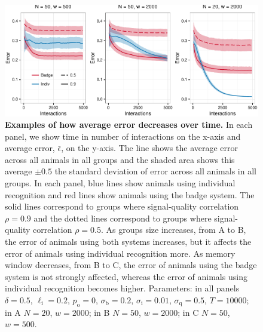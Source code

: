\begin{figure}
\label{learning_curves}
\includegraphics[width=.95\textwidth]{figures/learning_curves.pdf}
\caption{\label{learning_curves} \sffamily\small\textbf{Examples of how average error decreases over time.}
In each panel, we show time in number of interactions on the x-axis and average error, $\bar{\epsilon}$, on the y-axis. The line shows the average error across all animals in all groups and the shaded area shows this average $\pm 0.5$ the standard deviation of error across all animals in all groups. In each panel, blue lines show animals using individual recognition and red lines show animals using the badge system. The solid lines correspond to groups where signal-quality correlation $\rho=0.9$ and the dotted lines correspond to groups where signal-quality correlation $\rho=0.5$. As groups size increases, from A to B, the error of animals using both systems increases, but it affects the error of animals using individual recognition more. As memory window decreases, from B to C, the error of animals using the badge system is not strongly affected, whereas the error of animals using individual recognition becomes higher. Parameters: in all panels $\delta = 0.5$, $\ell_\text{i}=0.2$, $p_\text{o}=0$, $\sigma_\text{b}=0.2$, $\sigma_\text{i}=0.01$, $\sigma_\text{q}=0.5$, $T=10000$; in A $N=20$, $w=2000$; in B $N=50$, $w=2000$; in C $N=50$, $w=500$. }
\end{figure}

